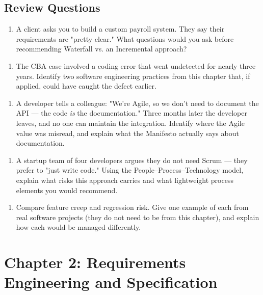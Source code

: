 \documentclass[11pt,a4paper]{book}
\begin{document}
\medskip

\section{Review Questions}

\begin{enumerate}
  \item A client asks you to build a custom payroll system. They say their requirements are "pretty clear." What questions would you ask before recommending Waterfall vs. an Incremental approach?
\end{enumerate}

\begin{enumerate}
  \item The CBA case involved a coding error that went undetected for nearly three years. Identify two software engineering practices from this chapter that, if applied, could have caught the defect earlier.
\end{enumerate}

\begin{enumerate}
  \item A developer tells a colleague: "We're Agile, so we don't need to document the API --- the code \textit{is} the documentation." Three months later the developer leaves, and no one can maintain the integration. Identify where the Agile value was misread, and explain what the Manifesto actually says about documentation.
\end{enumerate}

\begin{enumerate}
  \item A startup team of four developers argues they do not need Scrum --- they prefer to "just write code." Using the People--Process--Technology model, explain what risks this approach carries and what lightweight process elements you would recommend.
\end{enumerate}

\begin{enumerate}
  \item Compare feature creep and regression risk. Give one example of each from real software projects (they do not need to be from this chapter), and explain how each would be managed differently.
\end{enumerate}


\chapter{Chapter 2: Requirements Engineering and Specification}
\end{document}
